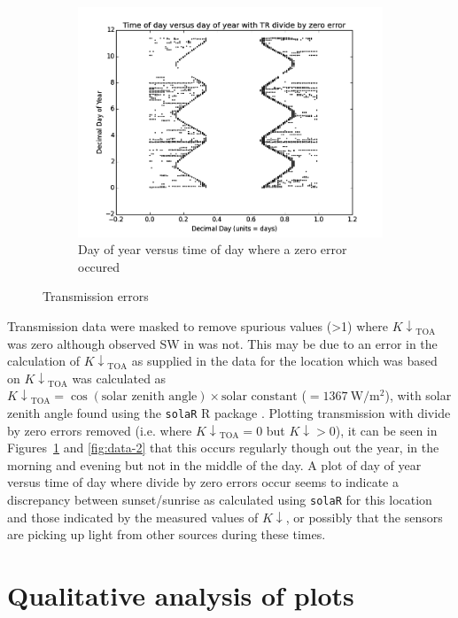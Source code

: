 \documentclass[a4paper,titlepage, twoside]{report}
\newcommand\Kdown{K\!\!\downarrow}
\newcommand\Kdowntoa{{K\!\!\downarrow}_\mathrm{TOA}}
\begin{document}
\begin{figure}
\begin{subfigure}{0.48\textwidth}
\includegraphics[width=\textwidth]{000c_transmission_errors_3.png}
\caption{Day of year versus time of day where a zero error occured}
\end{subfigure}
\caption{Transmission errors}
\label{fig:data-1}
\end{figure}

Transmission data were masked to remove spurious values (>1) where $\Kdowntoa$ was zero although observed SW in was not. This may be due to an error in the calculation of $\Kdowntoa$ as supplied in the data for the location which was based on $\Kdowntoa$ was calculated as $\Kdowntoa = \cos(\text{solar zenith angle}) \times \text{solar constant}$ ($=\SI{1367}{\watt\per\meter\squared}$), with solar zenith angle found using the \texttt{solaR} R package \parencite{solaR}.  Plotting transmission with divide by zero errors removed (i.e. where $\Kdowntoa = 0$ but $\Kdown > 0$), it can be seen in Figures~\ref{fig:data-1} and \ref{fig:data-2} that this occurs regularly though out the year, in the morning and evening but not in the middle of the day. A plot of day of year versus time of day where divide by zero errors occur seems to indicate a discrepancy between sunset/sunrise as calculated using \texttt{solaR} for this location and those indicated by the measured values of $\Kdown$, or possibly that the sensors are picking up light from other sources during these times.

\section{Qualitative analysis of plots}
\end{document}
